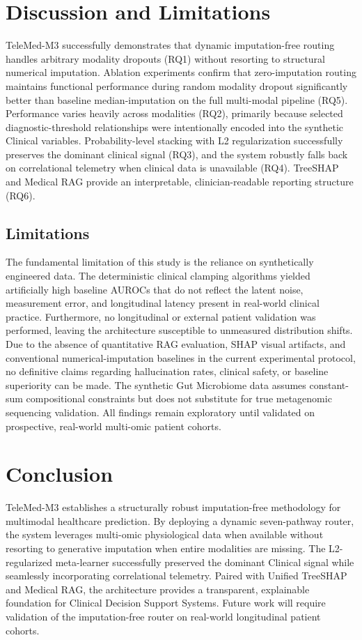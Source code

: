 \documentclass[journal, twocolumn]{IEEEtran}
\begin{document}
\section{Discussion and Limitations}
TeleMed-M3 successfully demonstrates that dynamic imputation-free routing handles arbitrary modality dropouts (RQ1) without resorting to structural numerical imputation. Ablation experiments confirm that zero-imputation routing maintains functional performance during random modality dropout significantly better than baseline median-imputation on the full multi-modal pipeline (RQ5). Performance varies heavily across modalities (RQ2), primarily because selected diagnostic-threshold relationships were intentionally encoded into the synthetic Clinical variables. Probability-level stacking with L2 regularization successfully preserves the dominant clinical signal (RQ3), and the system robustly falls back on correlational telemetry when clinical data is unavailable (RQ4). TreeSHAP and Medical RAG provide an interpretable, clinician-readable reporting structure (RQ6).

\subsection{Limitations}
The fundamental limitation of this study is the reliance on synthetically engineered data. The deterministic clinical clamping algorithms yielded artificially high baseline AUROCs that do not reflect the latent noise, measurement error, and longitudinal latency present in real-world clinical practice. Furthermore, no longitudinal or external patient validation was performed, leaving the architecture susceptible to unmeasured distribution shifts. Due to the absence of quantitative RAG evaluation, SHAP visual artifacts, and conventional numerical-imputation baselines in the current experimental protocol, no definitive claims regarding hallucination rates, clinical safety, or baseline superiority can be made. The synthetic Gut Microbiome data assumes constant-sum compositional constraints but does not substitute for true metagenomic sequencing validation. All findings remain exploratory until validated on prospective, real-world multi-omic patient cohorts.

\clearpage
\section{Conclusion}
TeleMed-M3 establishes a structurally robust imputation-free methodology for multimodal healthcare prediction. By deploying a dynamic seven-pathway router, the system leverages multi-omic physiological data when available without resorting to generative imputation when entire modalities are missing. The L2-regularized meta-learner successfully preserved the dominant Clinical signal while seamlessly incorporating correlational telemetry. Paired with Unified TreeSHAP and Medical RAG, the architecture provides a transparent, explainable foundation for Clinical Decision Support Systems. Future work will require validation of the imputation-free router on real-world longitudinal patient cohorts.
\end{document}
